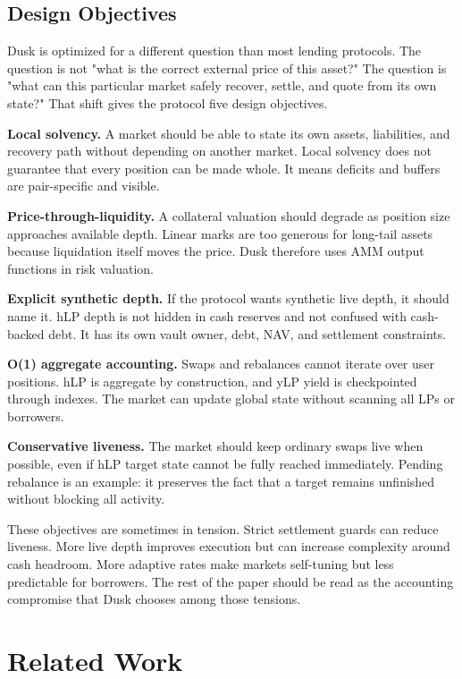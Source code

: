 \documentclass[11pt]{article}
\begin{document}
\subsection{Design Objectives}

Dusk is optimized for a different question than most lending protocols. The question is not "what is the correct external price of this asset?" The question is "what can this particular market safely recover, settle, and quote from its own state?" That shift gives the protocol five design objectives.

\textbf{Local solvency.} A market should be able to state its own assets, liabilities, and recovery path without depending on another market. Local solvency does not guarantee that every position can be made whole. It means deficits and buffers are pair-specific and visible.

\textbf{Price-through-liquidity.} A collateral valuation should degrade as position size approaches available depth. Linear marks are too generous for long-tail assets because liquidation itself moves the price. Dusk therefore uses AMM output functions in risk valuation.

\textbf{Explicit synthetic depth.} If the protocol wants synthetic live depth, it should name it. hLP depth is not hidden in cash reserves and not confused with cash-backed debt. It has its own vault owner, debt, NAV, and settlement constraints.

\textbf{O(1) aggregate accounting.} Swaps and rebalances cannot iterate over user positions. hLP is aggregate by construction, and yLP yield is checkpointed through indexes. The market can update global state without scanning all LPs or borrowers.

\textbf{Conservative liveness.} The market should keep ordinary swaps live when possible, even if hLP target state cannot be fully reached immediately. Pending rebalance is an example: it preserves the fact that a target remains unfinished without blocking all activity.

These objectives are sometimes in tension. Strict settlement guards can reduce liveness. More live depth improves execution but can increase complexity around cash headroom. More adaptive rates make markets self-tuning but less predictable for borrowers. The rest of the paper should be read as the accounting compromise that Dusk chooses among those tensions.

\section{Related Work}
\end{document}
